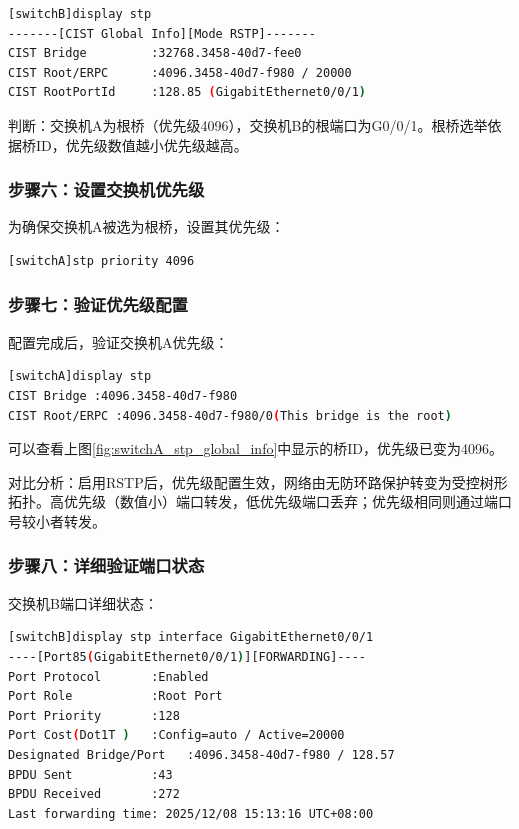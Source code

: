 \documentclass[a4paper]{article}
\begin{document}
\begin{lstlisting}[language=bash]
[switchB]display stp
-------[CIST Global Info][Mode RSTP]-------
CIST Bridge         :32768.3458-40d7-fee0
CIST Root/ERPC      :4096.3458-40d7-f980 / 20000
CIST RootPortId     :128.85 (GigabitEthernet0/0/1)
\end{lstlisting}

判断：交换机A为根桥（优先级4096），交换机B的根端口为G0/0/1。根桥选举依据桥ID，优先级数值越小优先级越高。

\subsubsection{步骤六：设置交换机优先级}

为确保交换机A被选为根桥，设置其优先级：

\begin{lstlisting}[language=bash]
[switchA]stp priority 4096
\end{lstlisting}

\subsubsection{步骤七：验证优先级配置}

配置完成后，验证交换机A优先级：

\begin{lstlisting}[language=bash]
[switchA]display stp
CIST Bridge :4096.3458-40d7-f980
CIST Root/ERPC :4096.3458-40d7-f980/0(This bridge is the root)
\end{lstlisting}
可以查看上图\ref{fig:switchA_stp_global_info}中显示的桥ID，优先级已变为4096。

对比分析：启用RSTP后，优先级配置生效，网络由无防环路保护转变为受控树形拓扑。高优先级（数值小）端口转发，低优先级端口丢弃；优先级相同则通过端口号较小者转发。

\subsubsection{步骤八：详细验证端口状态}
交换机B端口详细状态：
\begin{lstlisting}[language=bash]
[switchB]display stp interface GigabitEthernet0/0/1
----[Port85(GigabitEthernet0/0/1)][FORWARDING]----
Port Protocol       :Enabled
Port Role           :Root Port
Port Priority       :128
Port Cost(Dot1T )   :Config=auto / Active=20000
Designated Bridge/Port   :4096.3458-40d7-f980 / 128.57
BPDU Sent           :43
BPDU Received       :272
Last forwarding time: 2025/12/08 15:13:16 UTC+08:00
\end{lstlisting}
\end{document}
